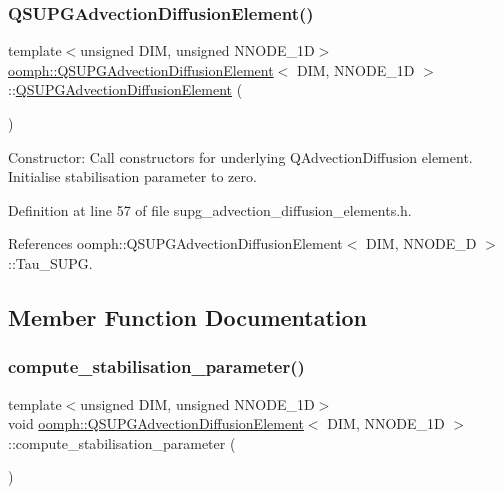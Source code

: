 \subsubsection{\texorpdfstring{Q\+S\+U\+P\+G\+Advection\+Diffusion\+Element()}{QSUPGAdvectionDiffusionElement()}}
{\footnotesize\ttfamily template$<$unsigned D\+IM, unsigned N\+N\+O\+D\+E\+\_\+1D$>$ \\
\hyperlink{classoomph_1_1QSUPGAdvectionDiffusionElement}{oomph\+::\+Q\+S\+U\+P\+G\+Advection\+Diffusion\+Element}$<$ D\+IM, N\+N\+O\+D\+E\+\_\+1D $>$\+::\hyperlink{classoomph_1_1QSUPGAdvectionDiffusionElement}{Q\+S\+U\+P\+G\+Advection\+Diffusion\+Element} (\begin{DoxyParamCaption}{ }\end{DoxyParamCaption})\hspace{0.3cm}{\ttfamily [inline]}}



Constructor\+: Call constructors for underlying Q\+Advection\+Diffusion element. Initialise stabilisation parameter to zero. 



Definition at line 57 of file supg\+\_\+advection\+\_\+diffusion\+\_\+elements.\+h.



References oomph\+::\+Q\+S\+U\+P\+G\+Advection\+Diffusion\+Element$<$ D\+I\+M, N\+N\+O\+D\+E\+\_\+D $>$\+::\+Tau\+\_\+\+S\+U\+PG.



\subsection{Member Function Documentation}
\mbox{\label{classoomph_1_1QSUPGAdvectionDiffusionElement_a0aaae49d23075bac8fc1f2d467354dce}} 
\subsubsection{\texorpdfstring{compute\+\_\+stabilisation\+\_\+parameter()}{compute\_stabilisation\_parameter()}}
{\footnotesize\ttfamily template$<$unsigned D\+IM, unsigned N\+N\+O\+D\+E\+\_\+1D$>$ \\
void \hyperlink{classoomph_1_1QSUPGAdvectionDiffusionElement}{oomph\+::\+Q\+S\+U\+P\+G\+Advection\+Diffusion\+Element}$<$ D\+IM, N\+N\+O\+D\+E\+\_\+1D $>$\+::compute\+\_\+stabilisation\+\_\+parameter (\begin{DoxyParamCaption}{ }\end{DoxyParamCaption})\hspace{0.3cm}{\ttfamily [inline]}}



